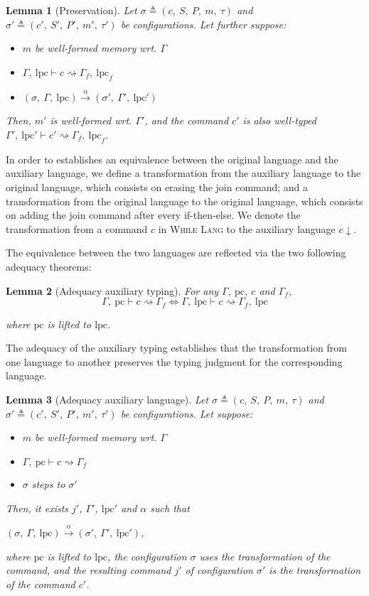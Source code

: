 \documentclass[10pt]{article}
\newcommand{\pc}{\mathrm{pc}}
\newcommand{\lpc}{\mathrm{lpc}}
\newcommand{\ctx}{\Gamma}
\newcommand{\conf}{\sigma}
\newcommand{\typing}[4]{ #1,~#2 \vdash #3 \rightsquigarrow #4}
\newcommand{\typingaux}[5]{ #1,~#2 \vdash #3 \rightsquigarrow #4,~#5}
\newcommand{\execaux}[7] { (#1,~#2,~#3) \xrightarrow{#4} (#5,~#6,~#7) }
\newcommand{\whilelang}{\textsc{While Lang} }
\newcommand{\compile}[1]{ #1 \downarrow }
\newtheorem{lemma}{Lemma}
\begin{document}
\begin{lemma}[Preservation]
  Let $\conf \triangleq (c,~S,~P,~m,~\tau)$ and
  $\conf' \triangleq (c',~S',~P',~m',~\tau')$ be configurations.
  Let further suppose:
  \begin{itemize}
    \item $m$ be well-formed memory wrt. $\ctx$
    \item $\typingaux{\ctx}{\lpc}{c}{\ctx_{f}}{\lpc_{f}}$
    \item \( \execaux{\conf}{\ctx}{\lpc}{\alpha}{\conf'}{\ctx'}{\lpc'} \)
  \end{itemize}

  Then, $m'$ is well-formed wrt. $\ctx'$, and the command $c'$ is also well-typed
  $\typingaux{\ctx'}{\lpc'}{c'}{\ctx_{f}}{\lpc_{f}}$.
\end{lemma}

In order to establishes an equivalence between the original language and the auxiliary language, we
define a transformation from the auxiliary language to the original language, which consists on
erasing the join command; and a transformation from the original language to the original language,
which consists on adding the join command after every if-then-else.
We denote the transformation from a command $c$ in \whilelang to the auxiliary language
$\compile{c}$.

The equivalence between the two languages are reflected via the two following adequacy theorems:

\begin{lemma}[Adequacy auxiliary typing]
  For any $\ctx$, $\pc$, $c$ and $\ctx_{f}$,
  \[
  \typing{\ctx}{\pc}{c}{\ctx_{f}}
  \Leftrightarrow
    \typingaux{\ctx}{\lpc}{c}{\ctx_{f}}{\lpc}
  \]

  where $\pc$ is lifted to $\lpc$.
\end{lemma}

The adequacy of the auxiliary typing establishes that the transformation from one language to
another preserves the typing judgment for the corresponding language.

\begin{lemma}[Adequacy auxiliary language]
  Let $\conf \triangleq (c,~S,~P,~m,~\tau)$ and
  $\conf' \triangleq (c',~S',~P',~m',~\tau')$ be configurations.
  Let suppose:
  \begin{itemize}
    \item $m$ be well-formed memory wrt. $\ctx$
    \item $\typing{\ctx}{\pc}{c}{\ctx_{f}}$
    \item $\conf$ steps to $\conf'$
  \end{itemize}

  Then, it exists $j'$, $\ctx'$, $\lpc'$ and $\alpha$ such that

  \( \execaux{\conf}{\ctx}{\lpc}{\alpha}{\conf'}{\ctx'}{\lpc'} \),

  where $\pc$ is lifted to $\lpc$, the configuration $\conf$ uses the transformation of the command,
  and the resulting command $j'$ of configuration $\conf'$ is the transformation of the command $c'$.
\end{lemma}
\end{document}
